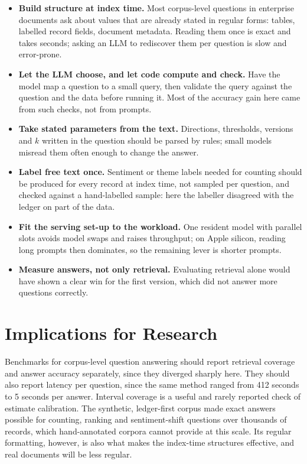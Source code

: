 \documentclass[11pt,letterpaper,oneside]{report}
\begin{document}
\begin{itemize}
  \item \textbf{Build structure at index time.} Most corpus-level questions
  in enterprise documents ask about values that are already stated in
  regular forms: tables, labelled record fields, document metadata. Reading
  them once is exact and takes seconds; asking an LLM to rediscover them per
  question is slow and error-prone.
  \item \textbf{Let the LLM choose, and let code compute and check.} Have the
  model map a question to a small query, then validate the query against
  the question and the data before running it. Most of the accuracy gain
  here came from such checks, not from prompts.
  \item \textbf{Take stated parameters from the text.} Directions,
  thresholds, versions and $k$ written in the question should be parsed by
  rules; small models misread them often enough to change the answer.
  \item \textbf{Label free text once.} Sentiment or theme labels needed for
  counting should be produced for every record at index time, not sampled
  per question, and checked against a hand-labelled sample: here the labeller
  disagreed with the ledger on part of the data.
  \item \textbf{Fit the serving set-up to the workload.} One resident model
  with parallel slots avoids model swaps and raises throughput; on Apple
  silicon, reading long prompts then dominates, so the remaining lever is
  shorter prompts.
  \item \textbf{Measure answers, not only retrieval.} Evaluating retrieval
  alone would have shown a clear win for the first version, which did not
  answer more questions correctly.
\end{itemize}

\section{Implications for Research}
\label{sec:research-implications}

Benchmarks for corpus-level question answering should report retrieval
coverage and answer accuracy separately, since they diverged sharply here.
They should also report latency per question, since the same method ranged
from 412 seconds to 5 seconds per answer. Interval coverage is a useful and
rarely reported check of estimate calibration. The synthetic, ledger-first
corpus made exact answers possible for counting, ranking and sentiment-shift
questions over thousands of records, which hand-annotated corpora cannot
provide at this scale. Its regular formatting, however, is also what makes
the index-time structures effective, and real documents will be less
regular.
\end{document}

